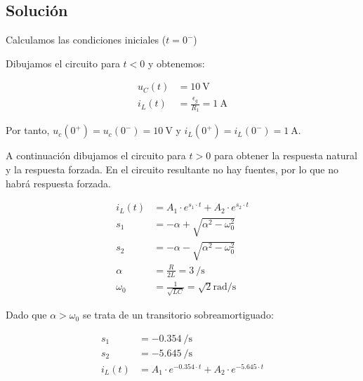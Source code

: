 \documentclass[12pt]{article}
\begin{document}
\subsection*{Solución}

Calculamos las condiciones iniciales ($t = 0^-$)

Dibujamos el circuito para $t < 0$ y obtenemos:

\begin{minipage}{0.3\textwidth}
\end{minipage}
\begin{minipage}{0.7\textwidth}
  \begin{align*}
    u_C(t) &= \SI{10}{\volt}\\
    i_L(t) &= \frac{\epsilon_g}{R_1} = \SI{1}{\ampere}
  \end{align*}
\end{minipage}

Por tanto, $u_c(0^+) = u_c(0^-) = \SI{10}{\volt}$ y $i_L(0^+) = i_L(0^-) = \SI{1}{\ampere}$.

A continuación dibujamos el circuito para $t > 0$ para obtener la respuesta natural y la respuesta forzada. En el circuito resultante no hay fuentes, por lo que no habrá respuesta forzada.

\begin{minipage}{0.3\textwidth}
\end{minipage}
\begin{minipage}{0.7\textwidth}
  \begin{align*}
    i_L(t) &= A_1 \cdot e^{s_1 \cdot t} + A_2 \cdot e^{s_2 \cdot t}\\
    s_1 &= -\alpha + \sqrt{\alpha^2 - \omega_0^2}\\
    s_2 &= -\alpha - \sqrt{\alpha^2 - \omega_0^2}\\
    \alpha &= \frac{R}{2L} = \SI{3}{\per\second}\\
    \omega_0 &= \frac{1}{\sqrt{LC}} = \sqrt{2}\si{\radian\per\second}
  \end{align*}
\end{minipage}

Dado que $\alpha > \omega_0$ se trata de un transitorio sobreamortiguado:

\begin{align*}
  s_1 &= \SI{-0.354}{\per\second}\\
  s_2 &= \SI{-5.645}{\per\second}\\
  i_L(t) &= A_1 \cdot e^{-0.354 \cdot t} + A_2 \cdot e^{-5.645 \cdot t}
\end{align*}
\end{document}

